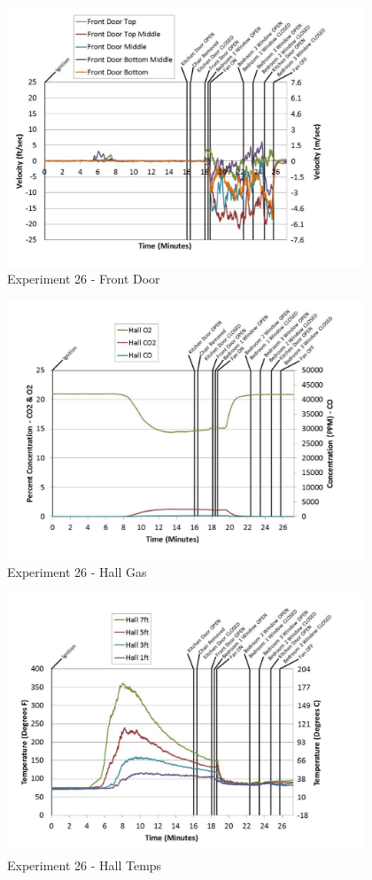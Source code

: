 \documentclass{article}
\begin{document}
\begin{appendices}
	\clearpage

	\begin{figure}[h!]
		\centering
		\includegraphics[height=3.05in]{0_Images/Results_Charts/Exp_26_Charts/FrontDoor.pdf}
		\caption{Experiment 26 - Front Door}
	\end{figure}
 

	\begin{figure}[h!]
		\centering
		\includegraphics[height=3.05in]{0_Images/Results_Charts/Exp_26_Charts/HallGas.pdf}
		\caption{Experiment 26 - Hall Gas}
	\end{figure}
 
	\clearpage

	\begin{figure}[h!]
		\centering
		\includegraphics[height=3.05in]{0_Images/Results_Charts/Exp_26_Charts/HallTemps.pdf}
		\caption{Experiment 26 - Hall Temps}
	\end{figure}
 


\end{appendices}
\end{document}
